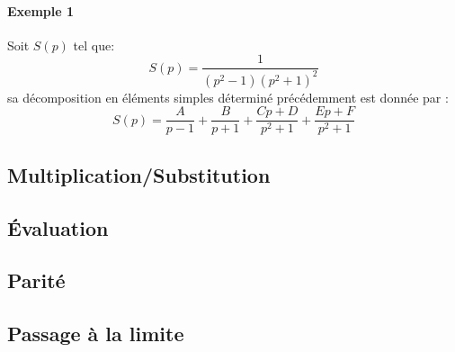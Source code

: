 \paragraph{Exemple 1}
Soit $S(p)$ tel que:
$$
S(p)=\dfrac{1}{(p^2-1)(p^2+1)^2}
$$
sa décomposition en éléments simples déterminé précédemment est donnée par :
$$
S(p)=\dfrac{A}{p-1}+\dfrac{B}{p+1}+\dfrac{Cp+D}{p^2+1}+\dfrac{Ep+F}{p^2+1}
$$

\subsection{Multiplication/Substitution}
\acpl
\subsection{\'Evaluation}
\acpl
\subsection{Parité}
\acpl
\subsection{Passage à la limite}
\acpl

